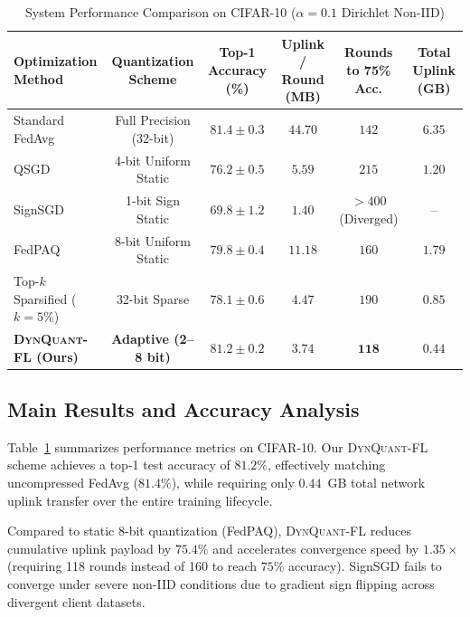 \documentclass[conference]{IEEEtran}
\begin{document}
\begin{table}[t]
\caption{System Performance Comparison on CIFAR-10 ($\alpha=0.1$ Dirichlet Non-IID)}
\label{tab:cifar10_results}
\centering
\begin{tabular}{@{}lccccc@{}}
\toprule
\textbf{Optimization Method} & \textbf{Quantization Scheme} & \textbf{Top-1 Accuracy (\%)} & \textbf{Uplink / Round (MB)} & \textbf{Rounds to 75\% Acc.} & \textbf{Total Uplink (GB)} \\
\midrule
Standard FedAvg~\cite{mcmahan2017communication} & Full Precision (32-bit) & $81.4 \pm 0.3$ & $44.70$ & $142$ & $6.35$ \\
QSGD~\cite{alistarh2017qsgd} & 4-bit Uniform Static & $76.2 \pm 0.5$ & $5.59$ & $215$ & $1.20$ \\
SignSGD~\cite{bernstein2018signsgd} & 1-bit Sign Static & $69.8 \pm 1.2$ & $1.40$ & $>400$ (Diverged) & -- \\
FedPAQ~\cite{kairouz2021advances} & 8-bit Uniform Static & $79.8 \pm 0.4$ & $11.18$ & $160$ & $1.79$ \\
Top-$k$ Sparsified ($k=5\%$) & 32-bit Sparse & $78.1 \pm 0.6$ & $4.47$ & $190$ & $0.85$ \\
\midrule
\textbf{\textsc{DynQuant-FL} (Ours)} & \textbf{Adaptive (2--8 bit)} & $\mathbf{81.2 \pm 0.2}$ & $\mathbf{3.74}$ & $\mathbf{118}$ & $\mathbf{0.44}$ \\
\bottomrule
\end{tabular}
\end{table}

\subsection{Main Results and Accuracy Analysis}
Table~\ref{tab:cifar10_results} summarizes performance metrics on CIFAR-10. Our \textsc{DynQuant-FL} scheme achieves a top-1 test accuracy of $81.2\%$, effectively matching uncompressed FedAvg ($81.4\%$), while requiring only $0.44$~GB total network uplink transfer over the entire training lifecycle.

Compared to static 8-bit quantization (FedPAQ), \textsc{DynQuant-FL} reduces cumulative uplink payload by $75.4\%$ and accelerates convergence speed by $1.35\times$ (requiring 118 rounds instead of 160 to reach $75\%$ accuracy). SignSGD fails to converge under severe non-IID conditions due to gradient sign flipping across divergent client datasets.
\end{document}

